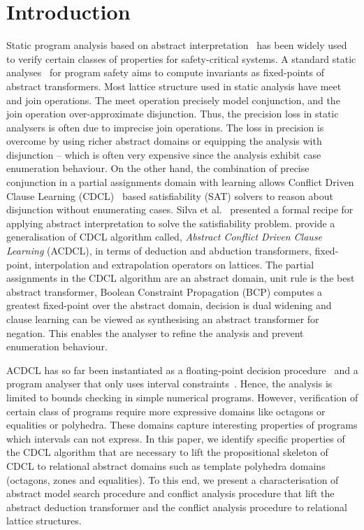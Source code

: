 \section{Introduction}

%
Static program analysis based on abstract interpretation~\cite{CC77} has
been widely used to verify certain classes of properties for safety-critical
systems.  A standard static analyses~\cite{se2011} for program safety aims
to compute invariants as fixed-points of abstract transformers.  Most
lattice structure used in static analysis have meet and join operations. 
The meet operation precisely model conjunction, and the join operation
over-approximate disjunction.  Thus, the precision loss in static analysers
is often due to imprecise join operations.  The loss in precision is
overcome by using richer abstract domains or equipping the analysis with
disjunction -- which is often very expensive since the analysis exhibit case
enumeration behaviour.
%
%
On the other hand, the combination of precise conjunction in a partial
assignments domain with learning allows Conflict Driven Clause Learning
(CDCL)~\cite{cdcl} based satisfiability (SAT) solvers to reason about
disjunction without enumerating cases.  Silva et al.~\cite{tacas12, sas12,
dhk2013-popl} presented a formal recipe for applying abstract interpretation
to solve the satisfiability problem.  \cite{dhk2013-popl} provide a
generalisation of CDCL algorithm called, {\em Abstract Conflict Driven
Clause Learning} (ACDCL), in terms of deduction and abduction transformers,
fixed-point, interpolation and extrapolation operators on lattices.  The
partial assignments in the CDCL algorithm are an abstract domain, unit rule
is the best abstract transformer, Boolean Constraint Propagation (BCP)
computes a greatest fixed-point over the abstract domain, decision is dual
widening and clause learning can be viewed as synthesising an abstract
transformer for negation.
%
This enables the
analyser to refine the analysis and prevent enumeration behaviour.

ACDCL has so far been instantiated as a floating-point decision
procedure~\cite{DBLP:journals/fmsd/BrainDGHK14} and a program analyser that
only uses interval constraints~\cite{tacas12}.  Hence, the analysis is
limited to bounds checking in simple numerical programs.  However,
verification of certain class of programs require more expressive domains
like octagons or equalities or polyhedra.  These domains capture interesting
properties of programs which intervals can not express.  In this paper, we
identify specific properties of the CDCL algorithm that are necessary to
lift the propositional skeleton of CDCL to relational abstract domains such
as template polyhedra domains~\cite{sriram} (octagons, zones and
equalities).  To this end, we present a characterisation of abstract model
search procedure and conflict analysis procedure that lift the abstract
deduction transformer and the conflict analysis procedure to relational
lattice structures.
